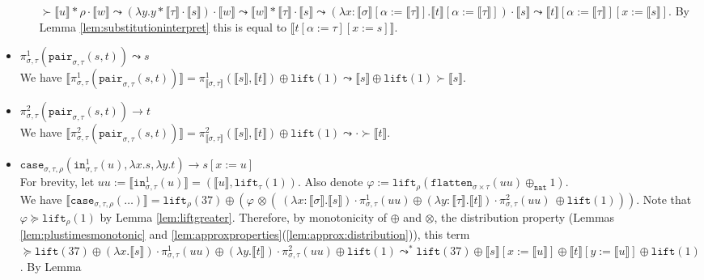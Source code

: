 \documentclass[runningheads,a4paper]{llncs}
\newcommand{\typeinterpret}[1]{\llbracket #1 \rrbracket}
\newcommand{\interpret}[1]{\llbracket #1 \rrbracket}
\newcommand{\red}{\longrightarrow}
\newcommand{\abs}[2]{\lambda #1.#2}
\newcommand{\nat}{\mathtt{nat}}
\newcommand{\proj}{\pi}
\newcommand{\flatten}{\mathtt{flatten}}
\newcommand{\lift}{\mathtt{lift}}
\begin{document}
\begin{itemize}
\begin{itemize}
    $\succ \interpret{u} * \rho \cdot \interpret{w}
    \leadsto (\abs{y}{y * \typeinterpret{\tau} \cdot \interpret{s}})
    \cdot \interpret{w} \leadsto \interpret{w} * \typeinterpret{\tau}
    \cdot \interpret{s} \leadsto (\abs{x:\typeinterpret{\sigma}[\alpha:=
    \typeinterpret{\tau}]}{\interpret{t}[\alpha:=\typeinterpret{\tau}]})
    \cdot \interpret{s} \leadsto \interpret{t}[\alpha:=\typeinterpret{
    \tau}][x:=\interpret{s}]$.  By Lemma
    \ref{lem:substitutioninterpret} this is equal to
    $\interpret{t[\alpha:=\tau][x:=s]}$.
  \end{itemize}
\item $\pi^1_{\sigma,\tau}(\mathtt{pair}_{\sigma,\tau}(s,t)) \leadsto
  s$ \\
  We have $\interpret{\pi^1_{\sigma,\tau}(\mathtt{pair}_{\sigma,\tau}(
  s,t))} = \pi^1_{\typeinterpret{\sigma,\tau}}(\interpret{s},
  \interpret{t}) \oplus \lift(1) \leadsto \interpret{s} \oplus
  \lift(1) \succ \interpret{s}$.
\item $\pi^2_{\sigma,\tau}(\mathtt{pair}_{\sigma,\tau}(s,t)) \red t$ \\
  We have $\interpret{\pi^2_{\sigma,\tau}(\mathtt{pair}_{\sigma,\tau}(
 s,t))} = \pi^2_{\typeinterpret{\sigma,\tau}}(\interpret{s},
  \interpret{t}) \oplus \lift(1) \leadsto \cdot \succ \interpret{t}$.
\item $\mathtt{case}_{\sigma,\tau,\rho}(\mathtt{in}^1_{\sigma,\tau}(u),
  \abs{x}{s},\abs{y}{t}) \red s[x:=u]$ \\
  For brevity, let $uu := \interpret{\mathtt{in}^1_{\sigma,\tau}(u)} =
  (\interpret{u}, \lift_\tau(1))$.
  Also denote $\varphi := \lift_\rho(\flatten_{\sigma \times \tau}(
  uu) \oplus_{\nat} 1)$. \\
  We have $\interpret{\mathtt{case}_{\sigma,\tau,\rho}(\dots)} =
  \lift_\rho(37) \oplus (\varphi\,\otimes (\ (\abs{x:
  \typeinterpret{\sigma}}{\interpret{s}}) \cdot \proj^1_{\sigma,\tau}(
  uu) \oplus
  (\abs{y:\typeinterpret{\tau}}{\interpret{t}}) \cdot \proj^2_{\sigma,
  \tau}(uu)\ \oplus \lift(1)))$.
  Note that $\varphi \succeq \lift_\rho(1)$ by
  Lemma \ref{lem:liftgreater}.  Therefore, by monotonicity of $\oplus$
  and $\otimes$, the distribution property (Lemmas
  \ref{lem:plustimesmonotonic} and
  \ref{lem:approxproperties}(\ref{lem:approx:distribution})), this
  term $\succeq \lift(37) \oplus (\abs{x}{\interpret{s}}) \cdot
  \proj^1_{\sigma,\tau}(uu) \oplus (\abs{y}{\interpret{t}}) \cdot
  \proj^2_{\sigma,\tau}(uu) \oplus \lift(1) \leadsto^* \lift(37) \oplus
  \interpret{s}[x:=\interpret{u}] \oplus
  \interpret{t}[y:=\interpret{u}] \oplus \lift(1)$.  By Lemma

\end{itemize}
\end{document}
